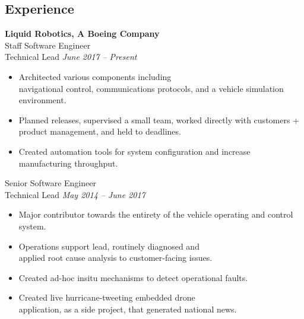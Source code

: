 \documentclass{article}
\begin{document}
{\begin{multicols}{2}
            \section*{Experience}
            \noindent
                \textbf{Liquid Robotics, A Boeing Company}\\
                Staff Software Engineer\\
                Technical Lead \hfill \textsl{June 2017 -- Present} \\
                \vspace{ -10px}
                \begin{itemize}[noitemsep,nolistsep]
                    \item Architected various components including \\navigational control, communications protocols, and a vehicle simulation environment.
                    \item Planned releases, supervised a small team, worked directly with customers + product management, and held to deadlines.
                    \item Created automation tools for system configuration and increase manufacturing throughput.
                \end{itemize}
                \vspace{10px}
                Senior Software Engineer\\
                Technical Lead \hfill \textsl{May 2014 -- June 2017} \\
                \vspace{ -10px}
                \begin{itemize}[noitemsep,nolistsep]
                	\item Major contributor towards the entirety of the vehicle operating and control system.
                     \item Operations support lead, routinely diagnosed and \\applied root cause analysis to customer-facing issues.
                     \item Created ad-hoc insitu mechanisms to detect operational faults. 
                     \item Created live hurricane-tweeting embedded drone \\application, as a side project, that generated national news.
                \end{itemize}

\end{multicols}}
\end{document}
